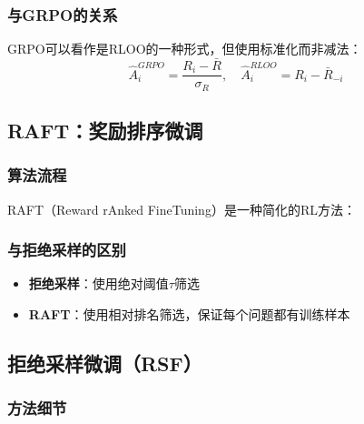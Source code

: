 \documentclass[12pt,a4paper]{article}
\newenvironment{algorithmic}[1][]%
      {\begin{list}{}{\leftmargin=2em\itemsep=0.2em\parsep=0pt\topsep=0.2em}}%
      {\end{list}}
\newcommand{\STATE}{\item[]}
\newcommand{\FOR}[1]{\item[]\textbf{for} ##1 \textbf{do}}
\newcommand{\ENDFOR}{\item[]\textbf{end for}}
\begin{document}
\subsubsection{与GRPO的关系}

GRPO可以看作是RLOO的一种形式，但使用标准化而非减法：
\begin{equation}
\hat{A}_i^{GRPO} = \frac{R_i - \bar{R}}{\sigma_R}, \quad \hat{A}_i^{RLOO} = R_i - \bar{R}_{-i}
\end{equation}

\subsection{RAFT：奖励排序微调}

\subsubsection{算法流程}

RAFT（Reward rAnked FineTuning）是一种简化的RL方法：


\subsubsection{与拒绝采样的区别}

\begin{itemize}
    \item \textbf{拒绝采样}：使用绝对阈值$\tau$筛选
    \item \textbf{RAFT}：使用相对排名筛选，保证每个问题都有训练样本
\end{itemize}

\subsection{拒绝采样微调（RSF）}

\subsubsection{方法细节}
\end{document}
